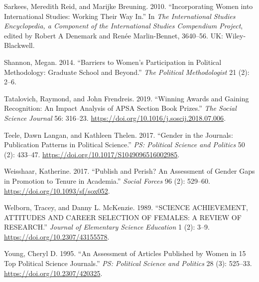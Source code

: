 \documentclass[
]{ccr}
\newlength{\cslhangindent}
\newlength{\cslentryspacingunit} %
\newenvironment{CSLReferences}[2] %
 {%
  \setlength{\parindent}{0pt}
  \ifodd #1
  \let\oldpar\par
  \def\par{\hangindent=\cslhangindent\oldpar}
  \fi
  \setlength{\parskip}{#2\cslentryspacingunit}
 }%
 {}
\begin{document}
\begin{CSLReferences}{1}{0}
\leavevmode{}%
Sarkees, Meredith Reid, and Marijke Breuning. 2010. {``Incorporating
{Women} into {International} {Studies}: {Working} {Their} {Way} {In}.''}
In \emph{The {International} {Studies} {Encyclopedia}, a Component of
the {International} {Studies} {Compendium} {Project}}, edited by Robert
A Denemark and Renée Marlin-Bennet, 3640--56. UK: Wiley-Blackwell.

\leavevmode{}%
Shannon, Megan. 2014. {``Barriers to {Women}'s {Participation} in
{Political} {Methodology}: {Graduate} {School} and {Beyond}.''}
\emph{The Political Methodologist} 21 (2): 2--6.

\leavevmode{}%
Tatalovich, Raymond, and John Frendreis. 2019. {``Winning Awards and
Gaining Recognition: {An} Impact Analysis of {APSA} Section Book
Prizes.''} \emph{The Social Science Journal} 56: 316--23.
\url{https://doi.org/10.1016/j.soscij.2018.07.006}.

\leavevmode{}%
Teele, Dawn Langan, and Kathleen Thelen. 2017. {``Gender in the
{Journals}: {Publication} {Patterns} in {Political} {Science}.''}
\emph{PS: Political Science and Politics} 50 (2): 433--47.
\url{https://doi.org/10.1017/S1049096516002985}.

\leavevmode{}%
Weisshaar, Katherine. 2017. {``Publish and {Perish}? {An} {Assessment}
of {Gender} {Gaps} in {Promotion} to {Tenure} in {Academia}.''}
\emph{Social Forces} 96 (2): 529--60.
\url{https://doi.org/10.1093/sf/sox052}.

\leavevmode{}%
Welborn, Tracey, and Danny L. McKenzie. 1989. {``{SCIENCE}
{ACHIEVEMENT}, {ATTITUDES} {AND} {CAREER} {SELECTION} {OF} {FEMALES}:
{A} {REVIEW} {OF} {RESEARCH}.''} \emph{Journal of Elementary Science
Education} 1 (2): 3--9. \url{https://doi.org/10.2307/43155578}.

\leavevmode{}%
Young, Cheryl D. 1995. {``An {Assessment} of {Articles} {Published} by
{Women} in 15 {Top} {Political} {Science} {Journals}.''} \emph{PS:
Political Science and Politics} 28 (3): 525--33.
\url{https://doi.org/10.2307/420325}.

\end{CSLReferences}
\end{document}

